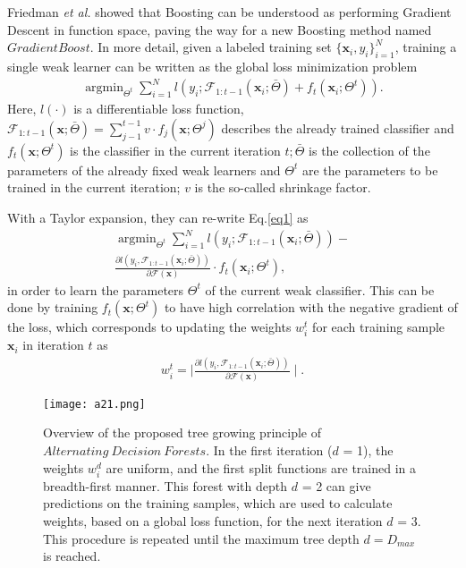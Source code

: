 \documentclass[10pt,twocolumn,letterpaper]{article}
\begin{document}
Friedman \emph{et al.} \cite{A} showed that Boosting can be understood as performing Gradient Descent in function space, paving the way for a new Boosting method named $GradientBoost$. In more detail, given a labeled training set $\{\mathbf{x}_i,y_i\}_{i=1}^N$, training a single weak learner can be written as the global loss minimization problem\\
\begin{gather*}
\mathop{\arg\min}_{\Theta^t}\sum_{i=1}^Nl(y_i;\mathcal{F}_{1:t-1}(\mathbf{x}_i;\bar{\Theta}) + f_t(\mathbf{x}_i;\Theta^t)).
\tag{1}
\label{eq1}
\end{gather*}
Here, $l(\cdot)$ is a differentiable loss function, $\mathcal{F}_{1:t-1}(\mathbf{x};\bar{\Theta}) = \sum_{j-1}^{t-1}v \cdot f_j(\mathbf{x};\Theta^j)$ describes the already trained classifier and $f_t(\mathbf{x};\Theta^t)$ is the classifier in the current iteration $t;\bar{\Theta}$ is the collection of the parameters of the already fixed weak learners and $\Theta^t$ are the parameters to be trained in the current iteration; $v$ is the so-called shrinkage factor.

With a Taylor expansion, they can re-write Eq.\ref{eq1} as \\
\begin{multline}
\mathop{\arg\min}_{\Theta^t}\sum_{i=1}^Nl(y_i;\mathcal{F}_{1:t-1}(\mathbf{x}_i;\bar{\Theta})) - \\
\frac{\partial l(y_i,\mathcal{F}_{1:t-1}(\mathbf{x}_i;\bar{\Theta}))}{\partial \mathcal{F}(\mathbf{x})} \cdot f_t(\mathbf{x}_i;\Theta^t),
\tag{2}
\end{multline}
in order to learn the parameters $\Theta^t$ of the current weak classifier. This can be done by training $f_t(\mathbf{x};\Theta^t)$ to have high correlation with the negative gradient of the loss, which corresponds to updating the weights $w_i^t$ for each training sample $\mathbf{x}_i$ in iteration $t$ as \\
\begin{gather*}
w_i^t = \mid \frac{\partial l(y_i,\mathcal{F}_{1:t-1}(\mathbf{x}_i;\bar{\Theta}))}{\partial\mathcal{F}(\mathbf{x})}\mid.
\tag{3}
\end{gather*}
\begin{figure*}
\begin{center}
\texttt{[image: a21.png]}
\end{center}
\caption{ Overview of the proposed tree growing principle of $Alternating
~Decision~Forests$. In the first iteration ($d$ = 1), the weights $w_i^d$ are uniform, and the first split functions are trained in a breadth-first manner. This forest with depth $d$ = 2 can give predictions on the training samples, which are used to calculate weights, based on a global loss function, for the next iteration $d$ = 3. This procedure is repeated until the maximum tree depth $d = D_{max}$ is reached.}
\label{fig}
\end{figure*}
\end{document}
